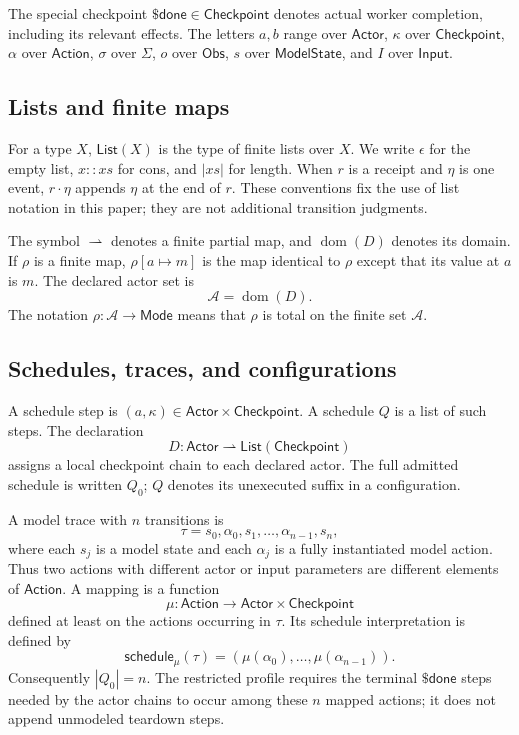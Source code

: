 \documentclass{article}
\newcommand{\Actor}{\mathsf{Actor}}
\newcommand{\Checkpoint}{\mathsf{Checkpoint}}
\newcommand{\Action}{\mathsf{Action}}
\newcommand{\State}{\Sigma}
\newcommand{\Obs}{\mathsf{Obs}}
\newcommand{\Model}{\mathsf{ModelState}}
\newcommand{\Input}{\mathsf{Input}}
\newcommand{\Mode}{\mathsf{Mode}}
\newcommand{\CPDone}{\mathsf{\$done}}
\newcommand{\ScheduleOf}{\mathsf{schedule}}
\begin{document}
The special checkpoint $\CPDone\in\Checkpoint$ denotes actual worker
completion, including its relevant effects. The letters $a,b$ range over
$\Actor$, $\kappa$ over $\Checkpoint$, $\alpha$ over $\Action$, $\sigma$ over
$\State$, $o$ over $\Obs$, $s$ over $\Model$, and $I$ over $\Input$.

\subsection{Lists and finite maps}

For a type $X$, $\mathsf{List}(X)$ is the type of finite lists over $X$. We
write $\epsilon$ for the empty list, $x::xs$ for cons, and $|xs|$ for length.
When $r$ is a receipt and $\eta$ is one event, $r\cdot\eta$ appends $\eta$ at
the end of $r$. These conventions fix the use of list notation in this paper;
they are not additional transition judgments.

The symbol $\rightharpoonup$ denotes a finite partial map, and
$\operatorname{dom}(D)$ denotes its domain. If $\rho$ is a finite map,
$\rho[a\mapsto m]$ is the map identical to $\rho$ except that its value at $a$
is $m$. The declared actor set is
\[
  \mathcal A=\operatorname{dom}(D).
\]
The notation $\rho:\mathcal A\to\Mode$ means that $\rho$ is total on the finite
set $\mathcal A$.

\subsection{Schedules, traces, and configurations}

A schedule step is $(a,\kappa)\in\Actor\times\Checkpoint$. A schedule $Q$ is a
list of such steps. The declaration
\[
  D:\Actor\rightharpoonup\mathsf{List}(\Checkpoint)
\]
assigns a local checkpoint chain to each declared actor. The full admitted
schedule is written $Q_0$; $Q$ denotes its unexecuted suffix in a configuration.

A model trace with $n$ transitions is
\[
  \tau=s_0,\alpha_0,s_1,\ldots,\alpha_{n-1},s_n,
\]
where each $s_j$ is a model state and each $\alpha_j$ is a fully instantiated
model action. Thus two actions with different actor or input parameters are
different elements of $\Action$. A mapping is a function
\[
  \mu:\Action\to\Actor\times\Checkpoint
\]
defined at least on the actions occurring in $\tau$. Its schedule interpretation
is defined by
\[
  \ScheduleOf_\mu(\tau)
  =(\mu(\alpha_0),\ldots,\mu(\alpha_{n-1})).
\]
Consequently $|Q_0|=n$. The restricted profile requires the terminal
$\CPDone$ steps needed by the actor chains to occur among these $n$ mapped
actions; it does not append unmodeled teardown steps.
\end{document}
